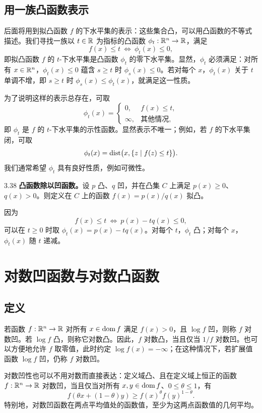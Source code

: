 \subsection{用一族凸函数表示}
后面将用到拟凸函数 $f$ 的下水平集的表示：这些集合凸，可以用凸函数的不等式描述。我们寻找一族以 $t\in\mathbb R$ 为指标的凸函数 $\phi_t:\mathbb R^n\to\mathbb R$，满足
\begin{equation}f(x)\leq t\ \Longleftrightarrow\ \phi_t(x)\leq0,\tag{3.23}\end{equation}
即拟凸函数 $f$ 的 $t$-下水平集是凸函数 $\phi_t$ 的零下水平集。显然，$\phi_t$ 必须满足：对所有 $x\in\mathbb R^n$，$\phi_t(x)\leq0$ 蕴含 $s\geq t$ 时 $\phi_s(x)\leq0$。若对每个 $x$，$\phi_t(x)$ 关于 $t$ 单调不增，即 $s\geq t$ 时 $\phi_s(x)\leq\phi_t(x)$，就满足这一性质。

为了说明这样的表示总存在，可取
\[\phi_t(x)=\begin{cases}0,&f(x)\leq t,\\\infty,&\text{其他情况},\end{cases}\]
即 $\phi_t$ 是 $f$ 的 $t$-下水平集的示性函数。显然表示不唯一；例如，若 $f$ 的下水平集闭，可取
\[\phi_t(x)=\operatorname{dist}\bigl(x,\{z\mid f(z)\leq t\}\bigr).\]
我们通常希望 $\phi_t$ 具有良好性质，例如可微性。
\begin{origexample}{3.38}
\textbf{凸函数除以凹函数。}设 $p$ 凸、$q$ 凹，并在凸集 $C$ 上满足 $p(x)\geq0$、$q(x)>0$。则定义在 $C$ 上的函数 $f(x)=p(x)/q(x)$ 拟凸。

因为
\[f(x)\leq t\ \Longleftrightarrow\ p(x)-tq(x)\leq0,\]
可以在 $t\geq0$ 时取 $\phi_t(x)=p(x)-tq(x)$。对每个 $t$，$\phi_t$ 凸；对每个 $x$，$\phi_t(x)$ 随 $t$ 递减。
\end{origexample}
\section{对数凹函数与对数凸函数}
\subsection{定义}
若函数 $f:\mathbb R^n\to\mathbb R$ 对所有 $x\in\operatorname{dom} f$ 满足 $f(x)>0$，且 $\log f$ 凹，则称 $f$ 对数凹。若 $\log f$ 凸，则称它对数凸。因此，$f$ 对数凸，当且仅当 $1/f$ 对数凹。也可以方便地允许 $f$ 取零值，此时约定 $\log f(x)=-\infty$；在这种情况下，若扩展值函数 $\log f$ 凹，仍称 $f$ 对数凹。

对数凹性也可以不用对数而直接表达：定义域凸、且在定义域上恒正的函数 $f:\mathbb R^n\to\mathbb R$ 对数凹，当且仅当对所有 $x,y\in\operatorname{dom} f$、$0\leq\theta\leq1$，有
\[f(\theta x+(1-\theta)y)\geq f(x)^\theta f(y)^{1-\theta}.\]
特别地，对数凹函数在两点平均值处的函数值，至少为这两点函数值的几何平均。

